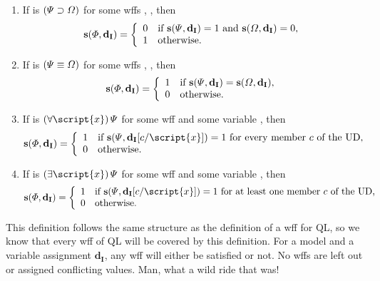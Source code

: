 \begin{enumerate}
\item If \metaA{} is $(\varPsi{}\supset\varOmega{})$ for some wffs \metaA{}, \metaB{}, then
\begin{displaymath}\mathbf{s}(\varPhi{}, \mathbf{d_I}) =
	\left\{\begin{array}{ll}
	0 & \mbox{if $\mathbf{s}(\varPsi{}, \mathbf{d_I}) = 1$ and $\mathbf{s}(\varOmega{}, \mathbf{d_I}) = 0$,}\\
	1 & \mbox{otherwise.}
	\end{array}\right.
\end{displaymath}

\item If \metaA{} is $(\varPsi{}\equiv\varOmega{})$ for some wffs \metaA{}, \metaB{}, then
\begin{displaymath}\mathbf{s}(\varPhi{}, \mathbf{d_I}) =
	\left\{\begin{array}{ll}
	1 & \mbox{if $\mathbf{s}(\varPsi{}, \mathbf{d_I}) = \mathbf{s}(\varOmega{}, \mathbf{d_I})$},\\
	0 & \mbox{otherwise.}
	\end{array}\right.
\end{displaymath}

\item If \metaA{} is $\qt{\forall}{\script{x}} \metaB{}$ for some wff \metaB{} and some variable , then
\begin{displaymath}\mathbf{s}(\metaA{}, \mathbf{d_I}) =
	\left\{\begin{array}{ll}
	1 & \mbox{if $\mathbf{s}(\metaB{}, \mathbf{d_I}[c/\script{x}])=1$ for every member $c$ of the UD},\\
	0 & \mbox{otherwise.}
	\end{array}\right.
\end{displaymath}

\item If \metaA{} is $\qt{\exists}{\script{x}} \metaB{}$ for some wff \metaB{} and some variable , then
\begin{displaymath}\mathbf{s}(\metaA{}, \mathbf{d_I}) =
	\left\{\begin{array}{ll}
	1 & \mbox{if $\mathbf{s}(\metaB{}, \mathbf{d_I}[c/\script{x}])=1$ for at least one member $c$ of the UD},\\
	0 & \mbox{otherwise.}
	\end{array}\right.
\end{displaymath}
\end{enumerate}
 
This definition follows the same structure as the definition of a wff for QL, so we know that every wff of QL will be covered by this definition. For a model  and a variable assignment $\mathbf{d_I}$, any wff will either be satisfied or not. No wffs are left out or assigned conflicting values. {\color{black}Man, what a wild ride that was!} 




